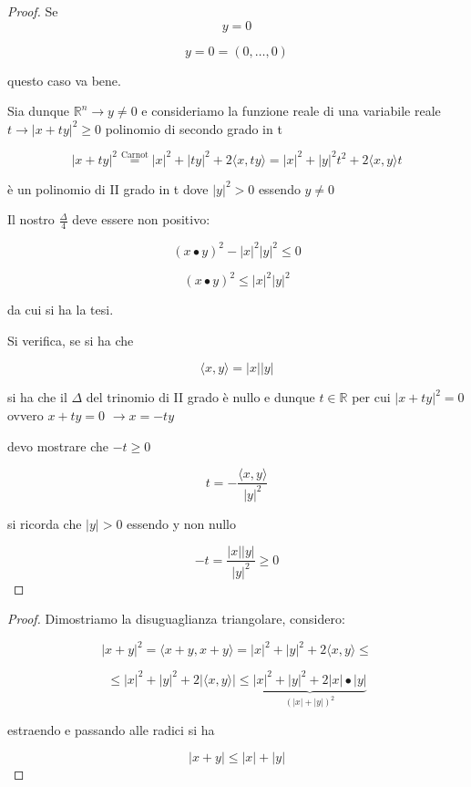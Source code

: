 \documentclass[11pt]{article}
\begin{document}
\begin{proof}
     Se
     \[
        y=0
     \]

     \[
         y=0=(0, \ldots ,0) 
     \]
     
     questo caso va bene.

     Sia dunque $\mathbb{R}^{n} \rightarrow y \neq 0$ e consideriamo la funzione reale di una variabile reale $t \rightarrow |x+ty|^{2}\ge 0$ polinomio di secondo grado in t

     \[
         |x + ty| ^{2} \overset{\text{Carnot}}{=} |x|^{2} + |ty|^{2} + 2\langle x,ty \rangle  = |x|^{2} + |y|^{2}t^{2} + 2 \langle x,y \rangle t
     \]

     è un polinomio di II grado in t dove $|y|^{2}> 0 $ essendo $y \neq 0$

     Il nostro $\frac{\Delta}{4}$ deve essere non positivo:

     \[
         (x\bullet y ) ^{2} - |x| ^{2}|y|^{2} \le 0
     \]

     \[
         (x\bullet y ) ^{2}\le  |x| ^{2}|y|^{2} 
     \]

     da cui si ha la tesi.

     Si verifica, se si ha che

     \[
         \langle x,y \rangle = |x| |y|
     \]

     si ha che il $\Delta$ del trinomio di II grado è nullo e dunque $t \in \mathbb{R}$ per cui $|x+ty|^{2}=0$ ovvero $x +ty=0$ $\rightarrow x=-ty$

     devo mostrare che $-t \ge 0$


     \[
         t = - \frac{\langle x,y \rangle}{|y|^{2}}
     \]

     si ricorda che $|y|>0$ essendo y non nullo

     \[
         -t = \frac{|x| |y|}{|y|^{2}}\ge 0
     \]

 \end{proof}
\newpage
\begin{proof}
       Dimostriamo la disuguaglianza triangolare, considero:

       \[
           |x+y|^{2} = \langle x+y , x+y \rangle = |x|^{2}+|y|^{2} + 2 \langle x,y \rangle \le 
       \]

       \[
           \le |x|^{2} + |y| ^{2} + 2|\langle x,y \rangle| \le \underbrace{|x| ^{2} + |y|^{2} + 2|x|\bullet |y|}_{(|x|+|y|)^{2}}
       \]

       estraendo e passando alle radici si ha

       \[
           |x+y| \le |x|+|y|
       \]
\end{proof}
\end{document}
